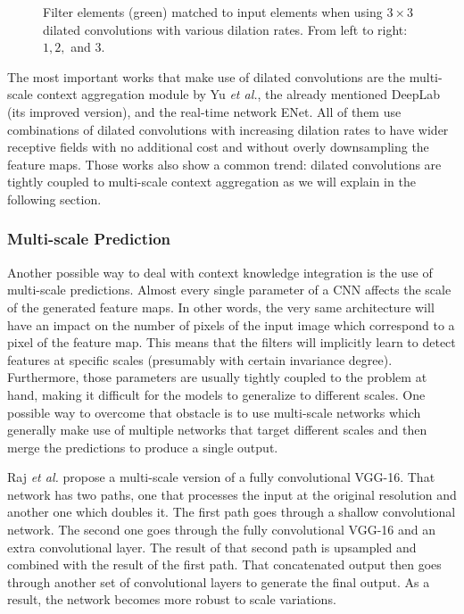 \begin{figure}[!hbt]
	\centering
	\caption{Filter elements (green) matched to input elements when using $3\times3$ dilated convolutions with various dilation rates. From left to right: $1, 2, $ and $3$.}
	\label{fig:dilated-convolution-filter}
\end{figure}

The most important works that make use of dilated convolutions are the multi-scale context aggregation module by Yu \emph{et al.}\cite{Yu2015}, the already mentioned DeepLab (its improved version)\cite{Chen2016}, and the real-time network ENet\cite{Paszke2016}. All of them use combinations of dilated convolutions with increasing dilation rates to have wider receptive fields with no additional cost and without overly downsampling the feature maps. Those works also show a common trend: dilated convolutions are tightly coupled to multi-scale context aggregation as we will explain in the following section.

\subsubsection{Multi-scale Prediction}

Another possible way to deal with context knowledge integration is the use of multi-scale predictions. Almost every single parameter of a \acs{CNN} affects the scale of the generated feature maps. In other words, the very same architecture will have an impact on the number of pixels of the input image which correspond to a pixel of the feature map. This means that the filters will implicitly learn to detect features at specific scales (presumably with certain invariance degree). Furthermore, those parameters are usually tightly coupled to the problem at hand, making it difficult for the models to generalize to different scales. One possible way to overcome that obstacle is to use multi-scale networks which generally make use of multiple networks that target different scales and then merge the predictions to produce a single output.

Raj \emph{et al.}\cite{Raj2015} propose a multi-scale version of a fully convolutional \acs{VGG}-16. That network has two paths, one that processes the input at the original resolution and another one which doubles it. The first path goes through a shallow convolutional network. The second one goes through the fully convolutional \acs{VGG}-16 and an extra convolutional layer. The result of that second path is upsampled and combined with the result of the first path. That concatenated output then goes through another set of convolutional layers to generate the final output. As a result, the network becomes more robust to scale variations.

